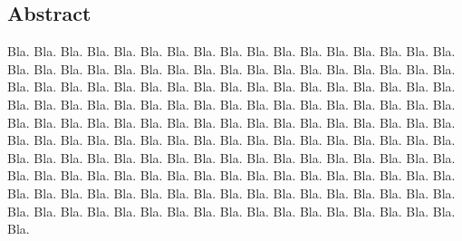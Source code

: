 \maketitle

\subsection*{Abstract}
Bla. Bla. Bla. Bla. Bla. Bla. Bla. Bla. Bla. Bla. Bla. Bla. Bla. Bla. Bla. Bla. Bla. Bla. Bla. Bla. Bla. Bla. Bla. Bla. Bla. Bla. Bla. Bla. Bla. Bla. Bla. Bla. Bla. Bla. Bla. Bla. Bla. Bla. Bla. Bla. Bla. Bla. Bla. Bla. Bla. Bla. Bla. Bla. Bla. Bla. Bla. Bla. Bla. Bla. Bla. Bla. Bla. Bla. Bla. Bla. Bla. Bla. Bla. Bla. Bla. Bla. Bla. Bla. Bla. Bla. Bla. Bla. Bla. Bla. Bla. Bla. Bla. Bla. Bla. Bla. Bla. Bla. Bla. Bla. Bla. Bla. Bla. Bla. Bla. Bla. Bla. Bla. Bla. Bla. Bla. Bla. Bla. Bla. Bla. Bla. Bla. Bla. Bla. Bla. Bla. Bla. Bla. Bla. Bla. Bla. Bla. Bla. Bla. Bla. Bla. Bla. Bla. Bla. Bla. Bla. Bla. Bla. Bla. Bla. Bla. Bla. Bla. Bla. Bla. Bla. Bla. Bla. Bla. Bla. Bla. Bla. Bla. Bla. Bla. Bla. Bla. Bla. Bla. Bla. Bla. Bla. Bla. Bla. Bla. Bla. Bla. Bla. Bla. Bla. Bla. Bla. Bla. Bla. Bla. Bla. Bla. Bla. Bla. Bla. Bla. Bla. Bla. Bla. Bla. Bla. Bla.

%
%
%
%
%



{\footnotesize 
}



